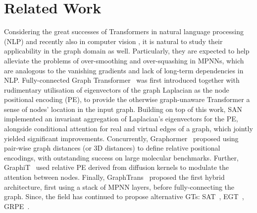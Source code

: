 \documentclass{article}
\begin{document}
\section{Related Work}

Considering the great successes of Transformers in natural language processing (NLP) \cite{vaswani2017attention, kalyan2021ammus_transformer_survey} and recently also in computer vision \cite{dascoli2021convit, han2022survey_vision_transformer, guo2021cmt}, it is natural to study their applicability in the graph domain as well. Particularly, they are expected to help alleviate the problems of over-smoothing and over-squashing \cite{alon2021on, topping2021understanding_ricci} in MPNNs, which are analogous to the vanishing gradients and lack of long-term dependencies in NLP. Fully-connected Graph Transformer~\cite{dwivedi2020generalization} was first introduced together with rudimentary utilisation of eigenvectors of the graph Laplacian as the node positional encoding (PE), to provide the otherwise graph-unaware Transformer a sense of nodes' location in the input graph.
Building on top of this work, SAN~\cite{kreuzer2021rethinking} implemented an invariant aggregation of Laplacian's eigenvectors for the PE, alongside conditional attention for real and virtual edges of a graph, which jointly yielded significant improvements.
Concurrently, Graphormer~\cite{ying2021graphormer,shi2022benchgraphormer} proposed using pair-wise graph distances (or 3D distances) to define relative positional encodings, with outstanding success on large molecular benchmarks.
Further, GraphiT~\cite{mialon2021graphit} used relative PE derived from diffusion kernels to modulate the attention between nodes. Finally, GraphTrans~\cite{jain2021graphtrans} proposed the first hybrid architecture, first using a stack of MPNN layers, before fully-connecting the graph.
Since, the field has continued to propose alternative GTs: SAT~\cite{chen2022SAT}, EGT~\cite{hussain2022EGT}, GRPE~\cite{park2022GRPE}.
\end{document}

